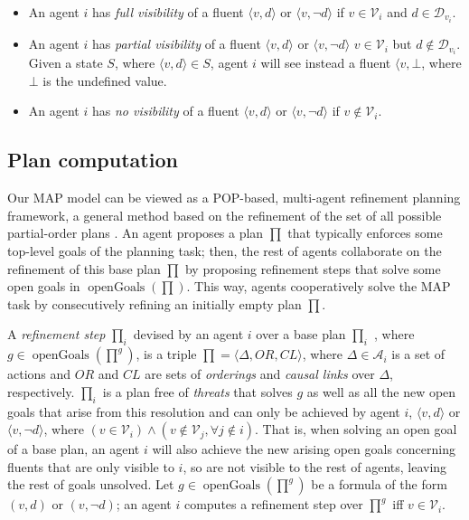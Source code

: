 \documentclass[12pt]{article}
\DeclareMathOperator{\openGoals}{openGoals}
\begin{document}
\begin{itemize}
  \item An agent $i$ has \textit{full visibility} of a fluent $\langle v,d\rangle$ or $\langle v,\neg d\rangle$ if $v \in \mathcal{V}_i$ and $d \in \mathcal{D}_{v_i}$.
  \item An agent $i$ has \textit{partial visibility} of a fluent $\langle v,d\rangle$ or $\langle v,\neg d\rangle$ $v \in \mathcal{V}_i$ but $d \notin \mathcal{D}_{v_i}$.
Given a state $S$, where $\langle v,d\rangle \in S$, agent $i$ will see instead a fluent $\langle v, \bot$, where $\bot$ is the undefined value.
  \item An agent $i$ has \textit{no visibility} of a fluent $\langle v,d\rangle$ or $\langle v,\neg d\rangle$ if $v \notin \mathcal{V}_i$.
\end{itemize}

\subsection{Plan computation}

Our MAP model can be viewed as a POP-based, multi-agent refinement planning framework, a general method based on the refinement of the set of all possible partial-order plans \cite{Kambhampati_1997}.
An agent proposes a plan $\prod$ that typically enforces some top-level goals of the planning task; then, the rest of agents collaborate on the refinement of this base plan $\prod$ by proposing refinement steps that solve some open goals in $\openGoals(\prod)$.
This way, agents cooperatively solve the MAP task by consecutively refining an initially empty plan $\prod$.

A \textit{refinement step} $\prod_i$ devised by an agent $i$ over a base plan $\prod_i$ , where $g \in \openGoals(\prod^g)$, is a triple $\prod = \langle \Delta, OR, CL\rangle$, where $\Delta \in \mathcal{A}_i$ is a set of actions and $OR$ and $CL$ are sets of \textit{orderings} and \textit{causal links} over $\Delta$, respectively.
$\prod_i$ is a plan free of \textit{threats} \cite{Younes2003VHPOPVH} that solves $g$ as well as all the new open goals that arise from this resolution and can only be achieved by agent $i$, $\langle v, d\rangle$ or $\langle v, \neg d\rangle$, where $(v \in \mathcal{V}_i) \wedge (v \notin \mathcal{V}_j, \forall j \notin i)$.
That is, when solving an open goal of a base plan, an agent $i$ will also achieve the new arising open goals concerning fluents that are only visible to $i$, so are not visible to the rest of agents, leaving the rest of goals unsolved.
Let $g \in \openGoals(\prod^g)$ be a formula of the form $(v, d)$ or $(v, ¬d)$; an agent $i$ computes a refinement step over $\prod^g$ iff $v \in \mathcal{V}_i$.
\end{document}
